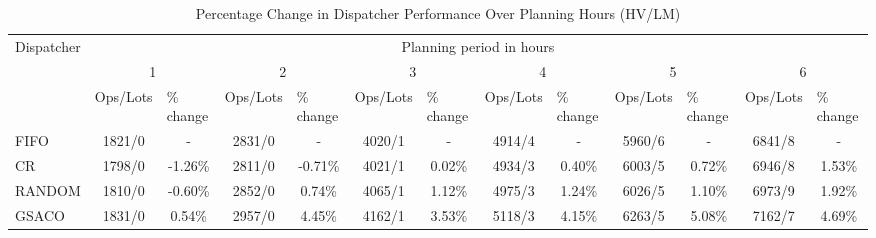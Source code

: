 \begin{table}[t]
	\caption{Percentage Change in Dispatcher Performance Over Planning Hours (HV/LM)}\label{tab:dispatchers-HVLM} 
	\begin{tabular}{|l|cccccccccccc|}
		\hline
		\multirow{3}{*}{Dispatcher} &
		\multicolumn{12}{c|}{Planning period in hours} \\ \cline{2-13} 
		&
		\multicolumn{2}{c|}{1} &
		\multicolumn{2}{c|}{2} &
		\multicolumn{2}{c|}{3} &
		\multicolumn{2}{c|}{4} &
		\multicolumn{2}{c|}{5} &
		\multicolumn{2}{c|}{6} \\ \cline{2-13} 
		&
		\multicolumn{1}{l|}{Ops/Lots} &
		\multicolumn{1}{l|}{\% change} &
		\multicolumn{1}{l|}{Ops/Lots} &
		\multicolumn{1}{l|}{\% change} &
		\multicolumn{1}{l|}{Ops/Lots} &
		\multicolumn{1}{l|}{\% change} &
		\multicolumn{1}{l|}{Ops/Lots} &
		\multicolumn{1}{l|}{\% change} &
		\multicolumn{1}{l|}{Ops/Lots} &
		\multicolumn{1}{l|}{\% change} &
		\multicolumn{1}{l|}{Ops/Lots} &
		\multicolumn{1}{l|}{\% change} \\ \hline 
		FIFO &
		\multicolumn{1}{c|}{1821/0} &
		\multicolumn{1}{c|}{-} &
		\multicolumn{1}{c|}{2831/0} &
		\multicolumn{1}{c|}{-} &
		\multicolumn{1}{c|}{4020/1} &
		\multicolumn{1}{c|}{-} &
		\multicolumn{1}{c|}{4914/4} &
		\multicolumn{1}{c|}{-} &
		\multicolumn{1}{c|}{5960/6} &
		\multicolumn{1}{c|}{-} &
		\multicolumn{1}{c|}{6841/8} &
		- \\
		CR &
		\multicolumn{1}{c|}{1798/0} &
		\multicolumn{1}{c|}{-1.26\%} &
		\multicolumn{1}{c|}{2811/0} &
		\multicolumn{1}{c|}{-0.71\%} &
		\multicolumn{1}{c|}{4021/1} &
		\multicolumn{1}{c|}{0.02\%} &
		\multicolumn{1}{c|}{4934/3} &
		\multicolumn{1}{c|}{0.40\%} &
		\multicolumn{1}{c|}{6003/5} &
		\multicolumn{1}{c|}{0.72\%} &
		\multicolumn{1}{c|}{6946/8} &
		1.53\% \\
		RANDOM &
		\multicolumn{1}{c|}{1810/0} &
		\multicolumn{1}{c|}{-0.60\%} &
		\multicolumn{1}{c|}{2852/0} &
		\multicolumn{1}{c|}{0.74\%} &
		\multicolumn{1}{c|}{4065/1} &
		\multicolumn{1}{c|}{1.12\%} &
		\multicolumn{1}{c|}{4975/3} &
		\multicolumn{1}{c|}{1.24\%} &
		\multicolumn{1}{c|}{6026/5} &
		\multicolumn{1}{c|}{1.10\%} &
		\multicolumn{1}{c|}{6973/9} &
		1.92\% \\
		GSACO &
		\multicolumn{1}{c|}{1831/0} &
		\multicolumn{1}{c|}{0.54\%} &
		\multicolumn{1}{c|}{2957/0} &
		\multicolumn{1}{c|}{4.45\%} &
		\multicolumn{1}{c|}{4162/1} &
		\multicolumn{1}{c|}{3.53\%} &
		\multicolumn{1}{c|}{5118/3} &
		\multicolumn{1}{c|}{4.15\%} &
		\multicolumn{1}{c|}{6263/5} &
		\multicolumn{1}{c|}{5.08\%} &
		\multicolumn{1}{c|}{7162/7} &
		4.69\% \\ \hline
	\end{tabular}%
\end{table}


